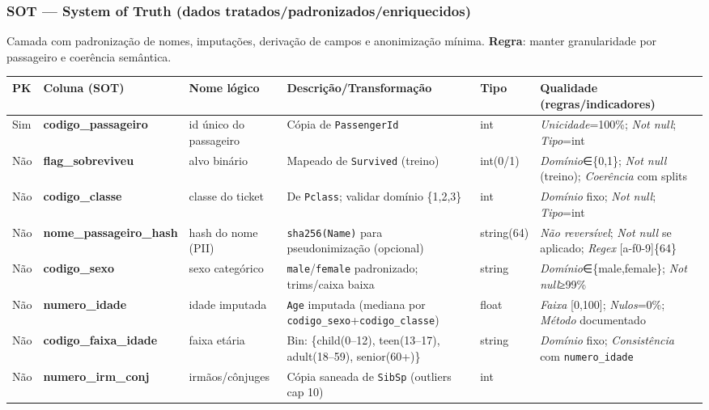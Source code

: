 \documentclass[12pt,a4paper]{article}
\begin{document}
\subsubsection*{SOT — System of Truth (dados tratados/padronizados/enriquecidos)}
Camada com padronização de nomes, imputações, derivação de campos e anonimização mínima. \textbf{Regra}: manter granularidade por passageiro e coerência semântica.

\begin{table}[h!]
\centering
\footnotesize
\begin{tabular}{@{}llp{3.2cm}p{6.1cm}lp{6.2cm}@{}}
\toprule
\textbf{PK} & \textbf{Coluna (SOT)} & \textbf{Nome lógico} & \textbf{Descrição/Transformação} & \textbf{Tipo} & \textbf{Qualidade (regras/indicadores)} \\
\midrule
Sim  & \textbf{codigo\_passageiro} & id único do passageiro &
Cópia de \texttt{PassengerId} & int &
\textit{Unicidade}=100\%; \textit{Not null}; \textit{Tipo}=int \\
Não  & \textbf{flag\_sobreviveu}   & alvo binário &
Mapeado de \texttt{Survived} (treino) & int(0/1) &
\textit{Domínio}∈\{0,1\}; \textit{Not null} (treino); \textit{Coerência} com splits \\
Não  & \textbf{codigo\_classe}     & classe do ticket &
De \texttt{Pclass}; validar domínio \{1,2,3\} & int &
\textit{Domínio} fixo; \textit{Not null}; \textit{Tipo}=int \\
Não  & \textbf{nome\_passageiro\_hash} & hash do nome (PII) &
\texttt{sha256(Name)} para pseudonimização (opcional) & string(64) &
\textit{Não reversível}; \textit{Not null} se aplicado; \textit{Regex} [a-f0-9]\{64\} \\
Não  & \textbf{codigo\_sexo}       & sexo categórico &
\texttt{male}/\texttt{female} padronizado; trims/caixa baixa & string &
\textit{Domínio}∈\{male,female\}; \textit{Not null}≥99\% \\
Não  & \textbf{numero\_idade}      & idade imputada &
\texttt{Age} imputada (mediana por \texttt{codigo\_sexo}+\texttt{codigo\_classe}) & float &
\textit{Faixa} [0,100]; \textit{Nulos}=0\%; \textit{Método} documentado \\
Não  & \textbf{codigo\_faixa\_idade} & faixa etária &
Bin: \{child(0–12), teen(13–17), adult(18–59), senior(60+)\} & string &
\textit{Domínio} fixo; \textit{Consistência} com \texttt{numero\_idade} \\
Não  & \textbf{numero\_irm\_conj}  & irmãos/cônjuges &
Cópia saneada de \texttt{SibSp} (outliers cap 10) & int &

\end{tabular}
\end{table}
\end{document}
